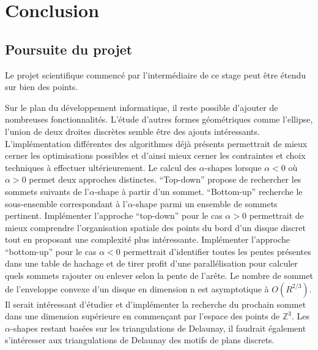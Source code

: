 \section{Conclusion}




\subsection{Poursuite du projet}

Le projet scientifique commencé par l'intermédiaire de ce stage peut être étendu sur bien des points. 

Sur le plan du développement informatique, il reste possible d'ajouter de nombreuses fonctionnalités. L’étude d'autres formes géométriques comme l'ellipse, l'union de deux droites discrètes semble être des ajouts intéressants. L'implémentation différentes des algorithmes déjà présents permettrait de mieux cerner les optimisations possibles et d'ainsi mieux cerner les contraintes et choix techniques à effectuer ultérieurement. Le calcul des $\alpha$-shapes lorsque $\alpha < 0$ où $\alpha > 0$ permet deux approches distinctes. ``Top-down'' propose de rechercher les sommets suivants de l'$\alpha$-shape à partir d'un sommet. ``Bottom-up'' recherche le sous-ensemble correspondant à l'$\alpha$-shape parmi un ensemble de sommets pertinent. Implémenter l'approche ``top-down'' pour le cas $\alpha > 0$ permettrait de mieux comprendre l'organisation spatiale des points du bord d'un disque discret tout en proposant une complexité plus intéressante. Implémenter l'approche ``bottom-up'' pour le cas $\alpha < 0$ permettrait d'identifier toutes les pentes présentes dans une table de hachage et de tirer profit d'une parallélisation pour calculer quels sommets rajouter ou enlever selon la pente de l'arête. Le nombre de sommet de l'enveloppe convexe d'un disque en dimension n est asymptotique à $O(R^{2/3})$. Il serait intéressant d'étudier et d'implémenter la recherche du prochain sommet dans une dimension supérieure en commençant par l'espace des points de $\mathbb{Z}^{3}$. Les $\alpha$-shapes restant basées sur les triangulations de Delaunay, il faudrait également s'intéresser aux triangulations de Delaunay des motifs de plans discrets.

